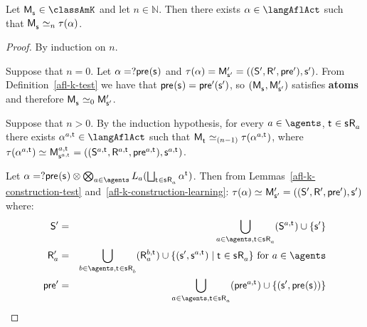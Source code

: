 \begin{proposition}\label{afl-k-correspondence}
Let $\aPModel{\aStateS} \in \classAmK$ and let $n \in \mathbb{N}$. 
Then there exists $\alpha \in \langAflAct$ such that $\aPModel{\aStateS} \bisimilar[n] \tau(\alpha)$.
\end{proposition}

\begin{proof}
By induction on $n$.

Suppose that $n = 0$.
Let $\alpha = \test{\aPrecondition(\aStateS)}$ and $\tau(\alpha) = \aPModel[\prime]{\aStateS[\prime]} = \aPModelTuple[\prime]{\aStateS[\prime]}$.
From Definition~\ref{afl-k-test} we have that $\aPrecondition(\aStateS) = \aPrecondition[\prime](\aStateS[\prime])$, so $(\aPModel{\aStateS}, \aPModel[\prime]{\aStateS[\prime]})$ satisfies {\bf atoms} and therefore $\aPModel{\aStateS} \bisimilar[0] \aPModel[\prime]{\aStateS[\prime]}$.

Suppose that $n > 0$. 
By the induction hypothesis, for every $\agentA \in \agents$, $\aStateT \in \aStateS \aAccessibility{\agentA}$ there exists $\alpha^{\agentA,\aStateT} \in \langAflAct$ such that $\aPModel{\aStateT} \bisimilar[(n - 1)] \tau(\alpha^{\agentA,\aStateT})$, where $\tau(\alpha^{\agentA,\aStateT}) \bisimilar \aPModel[\agentA,\aStateT]{\aStateS[\agentA,\aStateT]} = \aPModelTuple[\agentA,\aStateT]{\aStateS[\agentA,\aStateT]}$.

Let $\alpha = \test{\aPrecondition(\aStateS)} \compose \bigcompose_{\agentA \in \agents} \learns_\agentA (\bigchoice_{\aStateT \in \aStateS \aAccessibility{\agentA}} \alpha^{\aStateT})$. 
Then from Lemmas~\ref{afl-k-construction-test} and~\ref{afl-k-construction-learning}: $\tau(\alpha) \bisimilar \aPModel[\prime]{\aStateS[\prime]} = \aPModelTuple[\prime]{\aStateS[\prime]}$ where:
\begin{eqnarray*}
    \aStates[\prime] &=& \bigcup_{\agentA \in \agents, \aStateT \in \aStateS \aAccessibility{\agentA}} (\aStates[\agentA,\aStateT]) \cup \{\aStateS[\prime]\}\\
    \aAccessibility[\prime]{\agentA} &=& \bigcup_{\agentB \in \agents, \aStateT \in \aStateS \aAccessibility{\agentB}} (\aAccessibility[\agentB,\aStateT]{\agentA}) \cup \{(\aStateS[\prime], \aStateS[\agentA,\aStateT]) \mid \aStateT \in \aStateS \aAccessibility{\agentA}\} \text{ for } \agentA \in \agents\\
    \aPrecondition[\prime] &=& \bigcup_{\agentA \in \agents, \aStateT \in \aStateS \aAccessibility{\agentA}} (\aPrecondition[\agentA,\aStateT]) \cup \{(\aStateS[\prime], \aPrecondition(\aStateS))\}
\end{eqnarray*}


\end{proof}
